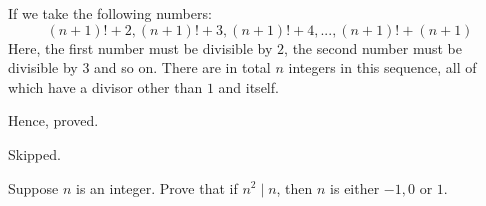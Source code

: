 \begin{solution}
	If we take the following numbers:
	$$(n+1)! + 2, (n+1)! + 3, (n+1)! + 4, ..., (n+1)! + (n+1)$$
	Here, the first number must be divisible by $2$, the second number must be divisible by $3$ and so on.
	There are in total $n$ integers in this sequence, all of which have a divisor other than $1$ and itself.

	Hence, proved.
\end{solution}

\begin{problem}Skipped.\end{problem}

\begin{problem}
	Suppose $n$ is an integer. Prove that if $n^2 \mid n$, then $n$ is either $-1, 0$ or $1$.
\end{problem}

\begin{solution}
	
\end{solution}
